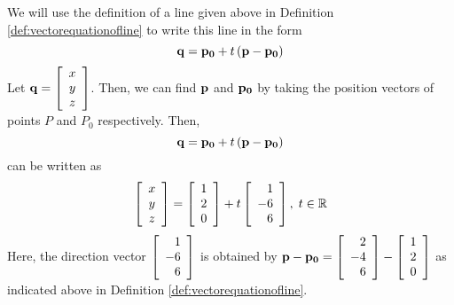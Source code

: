 \begin{solution}
We will use the definition of a line given above in Definition \ref{def:vectorequationofline} to write
this line in the form 
\begin{equation*}
{\bf q}={\bf p_0}+t\left( {\bf p}-{\bf p_0}\right)
\end{equation*}
Let ${\bf q} = 
\left[
\begin{array}{c}
x \\
y \\
z
\end{array}
\right]
$. Then, we can find ${\bf p}$ and ${\bf p_0}$ by taking the position vectors of points $P$ and $P_0$ 
respectively. 
Then, 
\begin{equation*}
{\bf q}={\bf p_0}+t\left( {\bf p}-{\bf p_0}\right)
\end{equation*}
can be written as
\begin{equation*}
\left[
\begin{array}{c}
x \\
y \\
z \\
\end{array}
\right]
 =
\left[
\begin{array}{c}
1 \\
2 \\
0
\end{array}
\right]
+
t
\left[
\begin{array}{r}
 1 \\
-6 \\
6  
\end{array}
\right],
\;t\in
\mathbb{R}
\end{equation*}
Here, the direction vector $
\left[
\begin{array}{r}
1 \\
-6 \\
6 
\end{array}
\right]
$
is obtained by $
{\bf p} - {\bf p_0} = 
\left[
\begin{array}{r}
2 \\
-4 \\
6
\end{array}
\right]
-
\left[
\begin{array}{r}
1 \\
2 \\
0
\end{array}
\right]
$
as indicated above in Definition \ref{def:vectorequationofline}.
\end{solution} 

